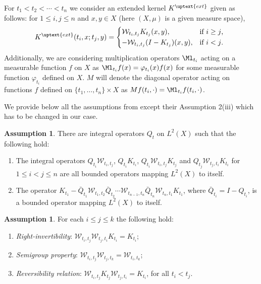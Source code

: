 \documentclass[]{pcmi}
\theoremstyle{plain}
\theoremstyle{definition}
\newtheorem{assumption}[equation]{Assumption}
\begin{document}
For $t_1<t_2<\dotsm<t_n$ we consider an extended kernel $K^\uptext{ext}$ given as follows: for $1\leq i,j\leq n$ and $x,y\in X$ (here $(X,\mu)$ is a given measure space),
\begin{equation}\label{eq:generalExt}
  K^\uptext{ext}(t_i,x;t_j,y)=
  \begin{dcases*}
    \mathcal{W}_{t_i,t_j}K_{t_j}(x,y), & if $i\geq j$,\\
    -\mathcal{W}_{t_i,t_j}(I-K_{t_j})(x,y), & if $i<j$.
  \end{dcases*}
\end{equation}
Additionally, we are considering multiplication operators $\Ml_{t_i}$ acting on a measurable function $f$ on $X$ as $\Ml_{t_i}f(x)=\varphi_{t_i}(x)f(x)$ for some measurable function $\varphi_{t_i}$ defined on $X$.
$M$ will denote the diagonal operator acting on functions $f$ defined on $\{t_1,\ldots,t_n\}\!\times\!X$ as $Mf(t_i,\cdot)=\Ml_{t_i}f(t_i,\cdot)$.

We provide below all the assumptions from \cite{bcr} except their Assumption 2(iii) which has to be changed in our case.

\begin{assumption}\label{assum:1}
There are integral operators $Q_t$ on $L^2(X)$ such that the following hold:
  \begin{enumerate}[label=(\roman*)]
  \item The integral operators $Q_{t_i}\mathcal{W}_{t_i,t_j}$, $Q_{t_i}K_{t_i}$,
  $Q_{t_i}\mathcal{W}_{t_i,t_j}K_{t_j}$ and $Q_{t_j}\mathcal{W}_{t_j,t_i}K_{t_i}$ for $1\leq i<j\leq n$
  are all bounded operators mapping $L^2(X)$ to itself.
  \item The operator $K_{t_1}-\bar Q_{t_1}\mathcal{W}_{t_1,t_2}\bar Q_{t_2}\cdots\mathcal{W}_{t_{n-1},t_n}\bar Q_{t_n}
  \mathcal{W}_{t_n,t_1}K_{t_1}$, where $\bar Q_{t_i}=I-Q_{t_i}$, is a bounded operator mapping
  $L^2(X)$ to itself.
  \end{enumerate}
\end{assumption}

\begin{assumption}\label{assum:2}
  For each $i\leq j\leq k$ the following hold:
    \begin{enumerate}[label=(\roman*)]
    \item \emph{Right-invertibility}: $\mathcal{W}_{t_i,t_j}\mathcal{W}_{t_j,t_i}K_{t_i}=K_{t_i}$;
    \item \emph{Semigroup property}: $\mathcal{W}_{t_i,t_j}\mathcal{W}_{t_j,t_k}=\mathcal{W}_{t_i,t_k}$;
    \item \emph{Reversibility relation}: $\mathcal{W}_{t_i,t_j}K_{t_{j}}\mathcal{W}_{t_j,t_{i}}=K_{t_{i}}$, for all $t_i<t_j$.
    \end{enumerate}
 \end{assumption}
 
\end{document}
